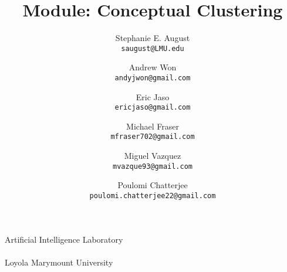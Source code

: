 %
%
%

\title{Module: Conceptual Clustering\\
}
\author{
 Stephanie E. August\\
  \texttt{saugust@LMU.edu}
  \and 
     Andrew Won\\
    \texttt{andyjwon@gmail.com} 
    \and
    Eric Jaso \\
    \texttt{ericjaso@gmail.com}
    \and
    Michael Fraser \\
    \texttt{mfraser702@gmail.com} 
    \and
    Miguel Vazquez \\
    \texttt{mvazque93@gmail.com}
    \and
    Poulomi Chatterjee \\
    \texttt{poulomi.chatterjee22@gmail.com}
  \vspace*{24mm}
}



\maketitle


\begin{center}
\vspace*{24mm}
\Large Artificial Intelligence Laboratory
\vspace{12mm}\\
\vspace{12mm}\\
\normalsize Loyola Marymount University

\end{center}


